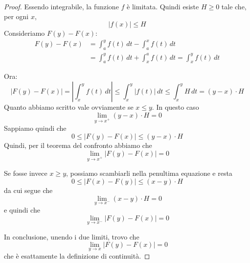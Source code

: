 \begin{proof}
Essendo integrabile, la funzione $f$ è limitata. Quindi esiste $H \ge 0$ tale che, per ogni $x$,
\begin{equation*}
|f(x)| \le H
\end{equation*}
Consideriamo $F(y)-F(x)$:
\begin{align*}
F(y)-F(x) &= \int_a^y f(t) \, dt - \int_a^x f(t) \, dt \\
&= \int_a^y f(t) \, dt + \int_x^a f(t) \, dt = \int_x^y f(t) \, dt
\end{align*}

Ora:
\begin{equation*}
|F(y)-F(x)| = \left\lvert \int_x^y f(t) \, dt \right\rvert \le \int_x^y |f(t)| \, dt \le \int_x^y H \, dt = (y-x) \cdot H
\end{equation*}
Quanto abbiamo scritto vale ovviamente se $x \le y$. In questo caso
\begin{equation*}
\lim_{y \to x^+} (y-x) \cdot H = 0
\end{equation*}
Sappiamo quindi che
\begin{equation*}
0 \le |F(y) - F(x)| \le (y-x) \cdot H 
\end{equation*}
Quindi, per il teorema del confronto abbiamo che
\begin{equation*}
\lim_{y \to x^+} |F(y)-F(x)| = 0
\end{equation*}

Se fosse invece $x \ge y$, possiamo scambiarli nella penultima equazione e resta
\begin{equation*}
0 \le |F(x) - F(y)| \le (x-y) \cdot H 
\end{equation*}
da cui segue che
\begin{equation*}
\lim_{y \to x^-} (x-y) \cdot H = 0
\end{equation*}
e quindi che
\begin{equation*}
\lim_{y \to x^-} |F(y)-F(x)| = 0
\end{equation*}

In conclusione, unendo i due limiti, trovo che
\begin{equation*}
\lim_{y \to x} |F(y)-F(x)| = 0
\end{equation*}
che è esattamente la definizione di continuità.
\end{proof}

